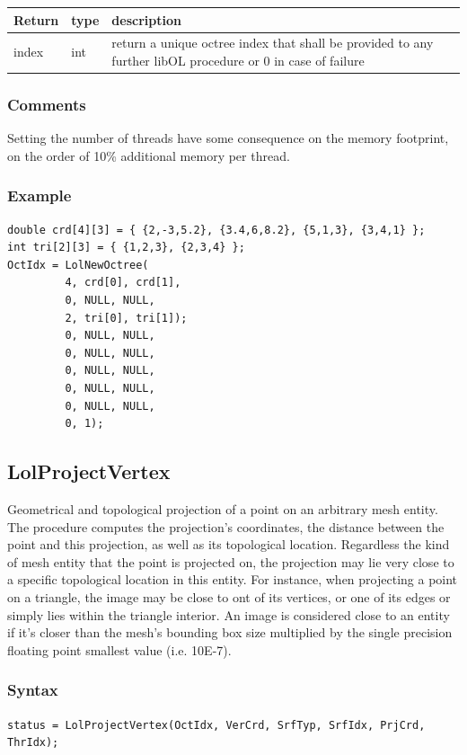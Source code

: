 \documentclass[a4paper,12pt]{article}
\begin{document}
\medskip

\begin{tabular}{|m{2cm}|m{2cm}|m{10cm}|}
\hline
Return     & type   & description \\
\hline
index      & int    & return a unique octree index that shall be provided to any further libOL procedure or 0 in case of failure \\
\hline
\end{tabular}
\subsubsection*{Comments}
Setting the number of threads have some consequence on the memory footprint, on the order of 10\% additional memory per thread.

\subsubsection*{Example}

\begin{tt}
\begin{verbatim}
double crd[4][3] = { {2,-3,5.2}, {3.4,6,8.2}, {5,1,3}, {3,4,1} };
int tri[2][3] = { {1,2,3}, {2,3,4} };
OctIdx = LolNewOctree(
         4, crd[0], crd[1],
         0, NULL, NULL,
         2, tri[0], tri[1]);
         0, NULL, NULL,
         0, NULL, NULL,
         0, NULL, NULL,
         0, NULL, NULL,
         0, NULL, NULL,
         0, 1);
\end{verbatim}
\end{tt}
\normalfont


\subsection{LolProjectVertex}
Geometrical and topological projection of a point on an arbitrary mesh entity. The procedure computes the projection's coordinates, the distance between the point and this projection, as well as its topological location. Regardless the kind of mesh entity that the point is projected on, the projection may lie very close to a specific topological location in this entity. For instance, when projecting a point on a triangle, the image may be close to ont of its vertices, or one of its edges or simply lies within the triangle interior. An image is considered close to an entity if it's closer than the mesh's bounding box size multiplied by the single precision floating point smallest value (i.e. 10E-7).

\subsubsection*{Syntax}
{\tt status = LolProjectVertex(OctIdx, VerCrd, SrfTyp, SrfIdx, PrjCrd, ThrIdx);}
\end{document}

